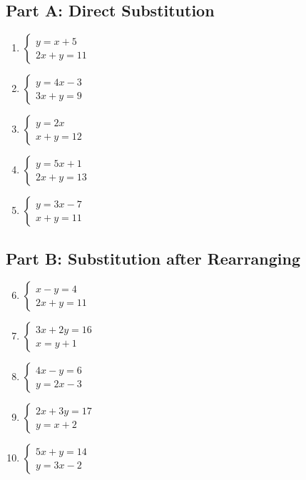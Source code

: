 \documentclass[12pt]{article}
\begin{document}
\subsection*{Part A: Direct Substitution}
\begin{enumerate}
    \item \(\begin{cases} y = x + 5 \\ 2x + y = 11 \end{cases}\)
    \item \(\begin{cases} y = 4x - 3 \\ 3x + y = 9 \end{cases}\)
    \item \(\begin{cases} y = 2x \\ x + y = 12 \end{cases}\)
    \item \(\begin{cases} y = 5x + 1 \\ 2x + y = 13 \end{cases}\)
    \item \(\begin{cases} y = 3x - 7 \\ x + y = 11 \end{cases}\)
\end{enumerate}

\subsection*{Part B: Substitution after Rearranging}
\begin{enumerate}
    \setcounter{enumi}{5}
    \item \(\begin{cases} x - y = 4 \\ 2x + y = 11 \end{cases}\)
    \item \(\begin{cases} 3x + 2y = 16 \\ x = y + 1 \end{cases}\)
    \item \(\begin{cases} 4x - y = 6 \\ y = 2x - 3 \end{cases}\)
    \item \(\begin{cases} 2x + 3y = 17 \\ y = x + 2 \end{cases}\)
    \item \(\begin{cases} 5x + y = 14 \\ y = 3x - 2 \end{cases}\)
\end{enumerate}
\end{document}
